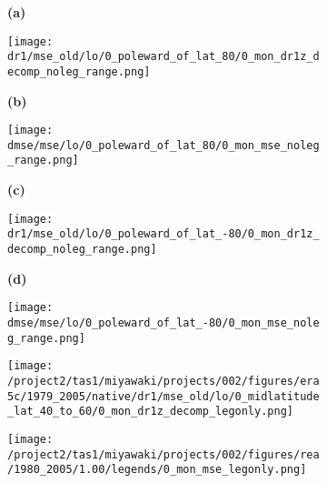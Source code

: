\documentclass[preview]{standalone}
\begin{document}
\begin{figure}
  \begin{subfigure}[t]{0.05\textwidth}
    \textbf{\normalsize{(a)}}
  \end{subfigure}
  \begin{subfigure}[t]{0.45\textwidth}
    \texttt{[image: dr1/mse\_old/lo/0\_poleward\_of\_lat\_80/0\_mon\_dr1z\_decomp\_noleg\_range.png]}
  \end{subfigure}
  \begin{subfigure}[t]{0.05\textwidth}
    \textbf{\normalsize{(b)}}
  \end{subfigure}
  \begin{subfigure}[t]{0.45\textwidth}
    \texttt{[image: dmse/mse/lo/0\_poleward\_of\_lat\_80/0\_mon\_mse\_noleg\_range.png]}
  \end{subfigure}

  \begin{subfigure}[t]{0.05\textwidth}
    \textbf{\normalsize{(c)}}
  \end{subfigure}
  \begin{subfigure}[t]{0.45\textwidth}
    \texttt{[image: dr1/mse\_old/lo/0\_poleward\_of\_lat\_-80/0\_mon\_dr1z\_decomp\_noleg\_range.png]}
  \end{subfigure}
  \begin{subfigure}[t]{0.05\textwidth}
    \textbf{\normalsize{(d)}}
  \end{subfigure}
  \begin{subfigure}[t]{0.45\textwidth}
    \texttt{[image: dmse/mse/lo/0\_poleward\_of\_lat\_-80/0\_mon\_mse\_noleg\_range.png]}
  \end{subfigure}

  \begin{subfigure}[t]{0.05\textwidth}
  \end{subfigure}
  \begin{subfigure}[t]{0.45\textwidth}
    \texttt{[image: /project2/tas1/miyawaki/projects/002/figures/era5c/1979\_2005/native/dr1/mse\_old/lo/0\_midlatitude\_lat\_40\_to\_60/0\_mon\_dr1z\_decomp\_legonly.png]}
  \end{subfigure}
  \begin{subfigure}[t]{0.05\textwidth}
    \hfill
  \end{subfigure}
  \begin{subfigure}[t]{0.42\textwidth}
    \texttt{[image: /project2/tas1/miyawaki/projects/002/figures/rea/1980\_2005/1.00/legends/0\_mon\_mse\_legonly.png]}
  \end{subfigure}

\end{figure}
\end{document}
